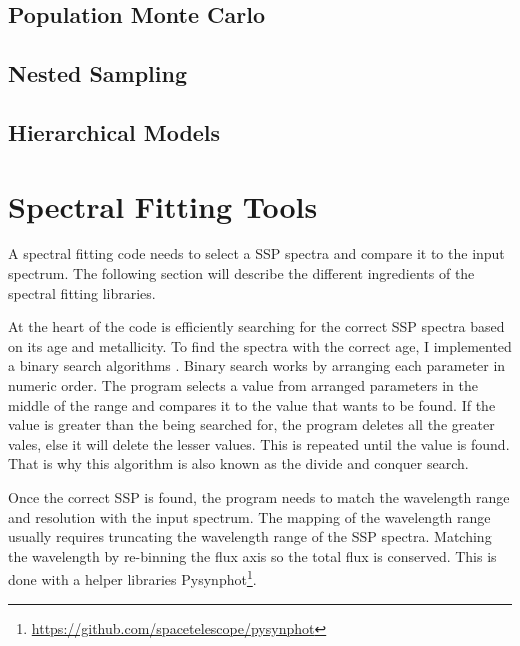 \documentclass[12pt,oneside,a4paper]{book}
\begin{document}
\subsection{Population Monte Carlo}


\subsection{Nested Sampling}

\subsection{Hierarchical Models}

\section{Spectral Fitting Tools}
A spectral fitting code needs to select a SSP spectra and compare it to the input spectrum. The following section will describe the different ingredients of the spectral fitting libraries.

At the heart of the code is efficiently searching for the correct SSP spectra based on its age and metallicity. To find the spectra with the correct age, I implemented a binary search algorithms \citep{press1992}. Binary search works by arranging each parameter in numeric order. The program selects a value from arranged parameters in the middle of the range and compares it to the value that wants to be found. If the value is greater than the being searched for, the program deletes all the greater vales, else it will delete the lesser values. This is repeated until the value is found. That is why this algorithm is also known as the divide and conquer search. 

Once the correct SSP is found, the program needs to match the wavelength range and resolution with the input spectrum. The mapping of the wavelength range usually requires truncating the wavelength range of the SSP spectra. Matching the wavelength by re-binning the flux axis so the total flux is conserved. This is done with a helper libraries Pysynphot\footnote{\url{https://github.com/spacetelescope/pysynphot}}.


\end{document}
